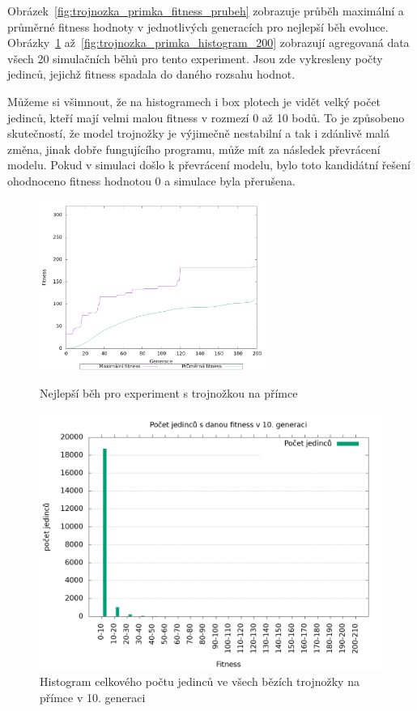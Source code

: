 Obrázek~\ref{fig:trojnozka_primka_fitness_prubeh} zobrazuje průběh maximální a průměrné fitness hodnoty v jednotlivých generacích pro nejlepší běh evoluce.
Obrázky~\ref{fig:trojnozka_primka_histogram_10} až~\ref{fig:trojnozka_primka_histogram_200} zobrazují agregovaná data všech 20 simulačních běhů pro tento experiment.
Jsou zde vykresleny počty jedinců, jejichž fitness spadala do daného rozsahu hodnot.

Můžeme si všimnout, že na histogramech i box plotech je vidět velký počet jedinců, kteří mají velmi malou fitness v rozmezí 0 až 10 bodů.
To je způsobeno skutečností, že model trojnožky je výjimečně nestabilní a tak i zdánlivě malá změna, jinak dobře fungujícího programu, může mít za následek převrácení modelu.
Pokud v simulaci došlo k převrácení modelu, bylo toto kandidátní řešení ohodnoceno fitness hodnotou 0 a simulace byla přerušena.


\begin{figure}[h]
    \begin{minipage}[c]{0.48\linewidth}
    {\includegraphics[width=20em]{obrazky/trojnozka_primka_fitness_prubeh.png}}
        \caption{
            Nejlepší běh pro experiment s trojnožkou na přímce
        }
        \label{fig:trojnozka_primka_fitness_prubeh}
    \end{minipage}
    \hfill
    \begin{minipage}[c]{0.48\linewidth}
        \includegraphics[width=\linewidth]{obrazky/trojnozka_primka_fitnessHistogram10.png}
        \caption{Histogram celkového počtu jedinců ve všech bězích trojnožky na přímce v 10. generaci}
        \label{fig:trojnozka_primka_histogram_10}
    \end{minipage}
\end{figure}

